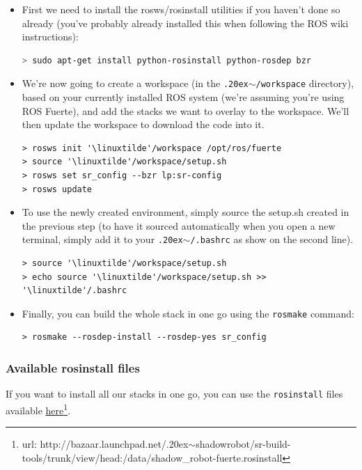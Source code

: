 \documentclass[12pt]{article}
\newcommand{\linuxtilde}{\raise.20ex\hbox{$\scriptstyle\mathtt{\sim}$}}
\begin{document}
\begin{itemize}
\item First we need to install the rosws/rosinstall utilities if you haven't done so already (you've probably already installed this when following the ROS wiki instructions):
  \begin{lstlisting}[language=Bash]
> sudo apt-get install python-rosinstall python-rosdep bzr
  \end{lstlisting}

\item We're now going to create a workspace (in the \texttt{\linuxtilde/workspace} directory), based on your currently installed ROS system (we're assuming you're using ROS Fuerte), and add the stacks we want to overlay to the workspace. We'll then update the workspace to download the code into it.
  \begin{lstlisting}[escapeinside='']
> rosws init '\linuxtilde'/workspace /opt/ros/fuerte
> source '\linuxtilde'/workspace/setup.sh
> rosws set sr_config --bzr lp:sr-config
> rosws update
  \end{lstlisting}

\item To use the newly created environment, simply source the setup.sh created in the previous step (to have it sourced automatically when you open a new terminal, simply add it to your \texttt{\linuxtilde/.bashrc} as show on the second line).
  \begin{lstlisting}[escapeinside='']
> source '\linuxtilde'/workspace/setup.sh
> echo source '\linuxtilde'/workspace/setup.sh >> '\linuxtilde'/.bashrc
  \end{lstlisting}

\item Finally, you can build the whole stack in one go using the \texttt{rosmake} command:
  \begin{lstlisting}[escapeinside='']
> rosmake --rosdep-install --rosdep-yes sr_config
  \end{lstlisting}

\end{itemize}

\subsubsection{Available rosinstall files}
\par If you want to install all our stacks in one go, you can use the \texttt{rosinstall} files available \href{http://bazaar.launchpad.net/~shadowrobot/sr-build-tools/trunk/view/head:/data/shadow_robot-fuerte.rosinstall}{here}\footnote{url: http://bazaar.launchpad.net/\linuxtilde shadowrobot/sr-build-tools/trunk/view/head:/data/shadow\_robot-fuerte.rosinstall}.\\
\end{document}
